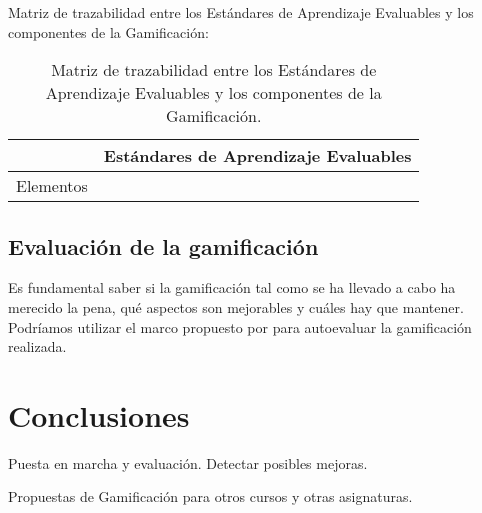\documentclass[a4paper, 12pt]{book}
\begin{document}
Matriz de trazabilidad entre los Estándares de Aprendizaje Evaluables y los componentes de la Gamificación:
\begin{table}[hbtp]
\begin{tabular}{c|c}
& Estándares de Aprendizaje Evaluables\\\hline
Elementos & \\\hline
\end{tabular}
\label{Trazabilidad}
\caption{Matriz de trazabilidad entre los Estándares de Aprendizaje Evaluables y los componentes de la Gamificación.}
\end{table}


\section{Evaluación de la gamificación}

Es fundamental saber si la gamificación tal como se ha llevado a cabo ha merecido la pena, qué aspectos son mejorables y cuáles hay que mantener.
%
Podríamos utilizar el marco propuesto por \cite{EvaluacionGamificacion} para autoevaluar la gamificación realizada.



\cleardoublepage
\chapter{Conclusiones}
\label{chap:conclusiones}



\label{sec:trabajos_futuros}

Puesta en marcha y evaluación. Detectar posibles mejoras.

Propuestas de Gamificación para otros cursos y otras asignaturas.



\end{document}
